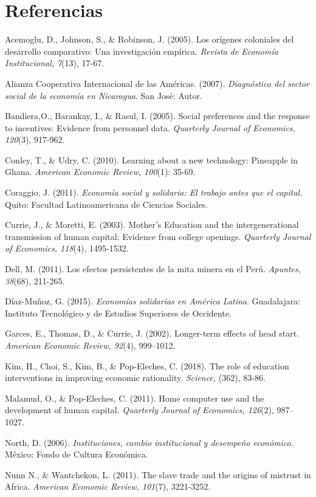 \documentclass[12]{article}
\begin{document}
\section*{Referencias}
\begin{hangparas}{.25in}{1}
Acemoglu, D., Johnson, S., \& Robinson, J. (2005). Los orígenes coloniales del desarrollo comparativo: Una investigación empírica. \textit{Revista de Economía Institucional, 7}(13), 17-67.

Alianza Cooperativa Internacional de las Américas. (2007). \textit{ Diagnóstico del sector social de la economía en Nicaragua}. San José: Autor.  

Bandiera,O.,  Barankay, I., \& Rasul, I. (2005). Social preferences and the response to incentives: Evidence from personnel data. \textit{Quarterly Journal of Economics, 120}(3), 917-962. 

Conley, T., \& Udry, C. (2010). Learning about a new technology: Pineapple in Ghana. \textit{American Economic Review, 100}(1): 35-69. 

Coraggio, J. (2011). \textit{Economía social y solidaria: El trabajo antes que el capital.} Quito: Facultad Latinoamericana de Ciencias Sociales.  

Currie, J., \& Moretti, E. (2003). Mother’s Education and the intergenerational transmission of human capital: Evidence from college openings. \textit{Quarterly Journal of Economics, 118}(4), 1495-1532.   

Dell, M. (2011). Los efectos persistentes de la mita minera en el Perú. \textit{Apuntes, 38}(68), 211-265. 

Díaz-Muñoz, G. (2015). \textit{Economías solidarias en América Latina}. Guadalajara: Instituto Tecnológico y de Estudios Superiores de Occidente.  

Garces, E., Thomas, D., \& Currie, J. (2002). Longer-term effects of head start. \textit{American Economic Review, 92}(4), 999–1012. 

Kim, H., Choi, S., Kim, B., \& Pop-Eleches, C. (2018). The role of education interventions in improving economic rationality. \textit{Science,} (362), 83-86. 

Malamud, O., \& Pop-Eleches, C. (2011). Home computer use and the development of human capital. \textit{Quarterly Journal of Economics, 126}(2), 987–1027. 

North, D. (2006). \textit{Instituciones, cambio institucional y desempeño económico}. México: Fondo de Cultura Económica. 

Nunn N., \& Wantchekon, L. (2011). The slave trade and the origins of mistrust in Africa. \textit{American Economic Review, 101}(7), 3221-3252. 


\end{hangparas}
\end{document}
